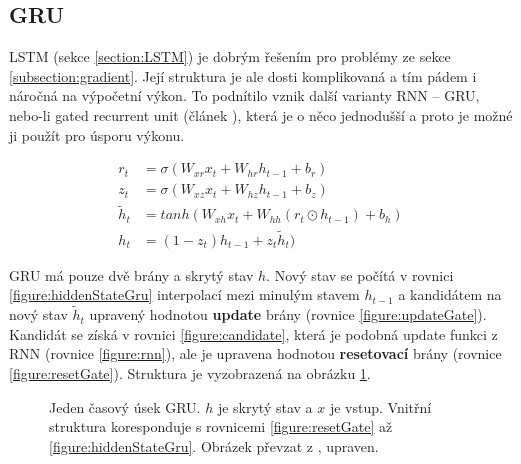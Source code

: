 \subsection{GRU}\label{section:GRU}
LSTM (sekce \ref{section:LSTM}) je dobrým řešením pro problémy ze sekce \ref{subsection:gradient}. Její struktura je ale dosti komplikovaná a tím pádem i náročná na výpočetní výkon. To podnítilo vznik další varianty RNN -- GRU, nebo-li gated recurrent unit (článek \cite{GRU}), která je o něco jednodušší a proto je možné ji použít pro úsporu výkonu.

\begin{align}
    r_{t}&=\sigma(W_{xr}x_{t}+W_{hr}h_{t-1}+b_{r}) \label{figure:resetGate} \\
    z_{t}&=\sigma(W_{xz}x_{t}+W_{hz}h_{t-1}+b_{z}) \label{figure:updateGate} \\
    \tilde{h}_{t}&=tanh(W_{xh}x_t + W_{hh}(r_t \odot h_{t-1}) + b_h) \label{figure:candidate} \\
    h_{t}&=(1 - z_t)h_{t-1} + z_{t}\tilde{h}_{t}) \label{figure:hiddenStateGru}
\end{align}

GRU má pouze dvě brány a skrytý stav $h$. Nový stav se počítá v rovnici \ref{figure:hiddenStateGru} interpolací mezi minulým stavem $h_{t-1}$ a kandidátem na nový stav $\tilde{h}_{t}$ upravený hodnotou \textbf{update} brány (rovnice \ref{figure:updateGate}). Kandidát se získá v rovnici \ref{figure:candidate}, která je podobná update funkci z RNN (rovnice \ref{figure:rnn}), ale je upravena hodnotou \textbf{resetovací} brány (rovnice \ref{figure:resetGate}). Struktura je vyzobrazená na obrázku \ref{img:GRU}.


\begin{figure}[H]
    \begin{center}
    \end{center}
	\caption{Jeden časový úsek GRU. $h$ je skrytý stav a $x$ je vstup. Vnitřní struktura koresponduje s rovnicemi \ref{figure:resetGate} až \ref{figure:hiddenStateGru}. Obrázek převzat z \cite{understandingLSTM}, upraven.}
	\label{img:GRU}
\end{figure}

